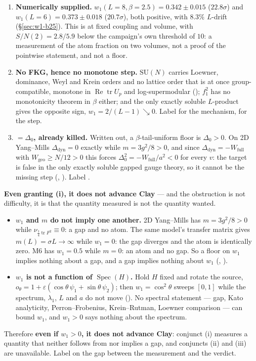 \begin{enumerate}
\item[(i)] \textbf{Numerically supplied.} $w_1(L=8,\beta=2.5)=0.342\pm0.015$ ($22.8\sigma$) and
  $w_1(L=6)=0.373\pm0.018$ ($20.7\sigma$), both positive, with $8.3\%$ $L$-drift
  (\S\ref{sec:w1-b25}). This is \LE{} at fixed coupling and volume, with $S/N(2)=2.8/5.9$ below
  the campaign's own threshold of $10$: a measurement of the atom fraction on two volumes, not a
  proof of the pointwise statement, and not a floor.
\item[(ii)] \textbf{No FKG, hence no monotone step.} $\mathrm{SU}(N)$ carries Loewner, dominance,
  Weyl and Krein orders and no lattice order that is at once group-compatible, monotone in
  $\operatorname{Re}\operatorname{tr}U_p$ and log-supermodular (); $f_1^2$ has no
  monotonicity theorem in $\beta$ either; and the only exactly soluble $L$-product gives the
  opposite sign, $w_1=2/(L-1)\searrow0$. Label \LN{} for the mechanism, \LM{} for the step.
\item[(iii)] \textbf{$=\Delta_0$, already killed.} Written out, a $\beta$-tail-uniform floor is
  $\Delta_0>0$. On 2D Yang--Mills $\Delta_{\mathrm{dyn}}=0$ exactly while $m=3g^2/8>0$, and since
  $\Delta_{\mathrm{dyn}}=-W_{\mathrm{full}}$ with $W_{\mathrm{geo}}\ge N/12>0$ this forces
  $\Delta_0^2=-W_{\mathrm{full}}/a^2<0$ for every $v$: the target is false in the only exactly
  soluble gapped gauge theory, so it cannot be the missing step (,
  ). Label \LN.
\end{enumerate}

\textbf{Even granting (i), it does not advance Clay} --- and the obstruction is not difficulty, it
is that the quantity measured is not the quantity wanted.
\begin{itemize}
\item \textbf{$w_1$ and $m$ do not imply one another.} 2D Yang--Mills has $m=3g^2/8>0$ while
  $\nu_{\frac14\operatorname{tr}F^2}\equiv0$: a gap and no atom. The same model's transfer matrix
  gives $m(L)=\sigma L\to\infty$ while $w_1=0$: the gap diverges and the atom is identically zero.
  M6 has $w_1=0.5$ while $m=0$: an atom and no gap. So a floor on $w_1$ implies nothing about a
  gap, and a gap implies nothing about $w_1$ (, ).
\item \textbf{$w_1$ is not a function of $\operatorname{Spec}(H)$.} Hold $H$ fixed and rotate the
  source, $o_\theta=1+\varepsilon(\cos\theta\,\psi_1+\sin\theta\,\psi_2)$; then
  $w_1=\cos^2\theta$ sweeps $[0,1]$ while the spectrum, $\lambda_1$, $L$ and $a$ do not move
  (). No spectral statement --- gap, Kato analyticity, Perron--Frobenius,
  Krein--Rutman, Loewner comparison --- can bound $w_1$, and $w_1>0$ says nothing about the
  spectrum.
\end{itemize}
Therefore \textbf{even if $w_1>0$, it does not advance Clay}: conjunct (i) measures a quantity
that neither follows from nor implies a gap, and conjuncts (ii) and (iii) are unavailable. Label
\LM{} on the gap between the measurement and the verdict.

